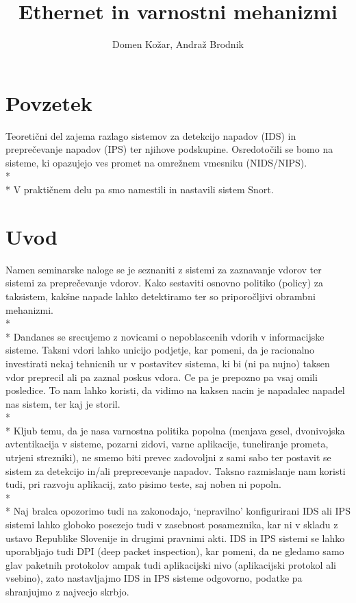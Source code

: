 \documentclass[12pt]{article}
\title{Ethernet in varnostni mehanizmi}
\author{Domen Kožar, Andraž Brodnik}
\let\stdsection\section
\renewcommand\section{\newpage\stdsection}
\begin{document}
\maketitle

\tableofcontents

\section{Povzetek}
Teoretični del zajema razlago sistemov za detekcijo napadov (IDS) in preprečevanje napadov (IPS) 
ter njihove podskupine. 
Osredotočili se bomo na sisteme, ki opazujejo ves promet na omrežnem vmesniku (NIDS/NIPS).
\\*
\\*
V praktičnem delu pa smo namestili in nastavili sistem Snort.

\section{Uvod}

Namen seminarske naloge se je seznaniti z sistemi za zaznavanje vdorov ter sistemi za preprečevanje vdorov. 
Kako sestaviti osnovno politiko (policy) za taksistem, kakšne napade lahko detektiramo ter so priporočljivi obrambni mehanizmi.
\\*
\\*
Dandanes se srecujemo z novicami o nepoblascenih vdorih v informacijske sisteme. Taksni vdori lahko unicijo podjetje, kar pomeni, da je racionalno investirati nekaj tehnicnih ur v postavitev sistema, ki bi (ni pa nujno) taksen vdor preprecil ali pa zaznal poskus vdora.
Ce pa je prepozno pa vsaj omili posledice. To nam lahko koristi,
da vidimo na kaksen nacin je napadalec napadel nas sistem, ter kaj je storil. 
\\*
\\*
Kljub temu, da je nasa varnostna politika popolna (menjava gesel, dvonivojska avtentikacija v sisteme, pozarni zidovi, varne aplikacije, tuneliranje prometa, utrjeni strezniki), ne smemo biti prevec zadovoljni z sami sabo ter postavit se sistem za detekcijo in/ali preprecevanje napadov.
Taksno razmislanje nam koristi tudi, pri razvoju aplikacij, zato pisimo teste, saj noben ni popoln.
\\*
\\*
Naj bralca opozorimo tudi na zakonodajo, `nepravilno' konfigurirani IDS ali IPS sistemi lahko globoko posezejo
tudi v zasebnost posameznika, kar ni v skladu z ustavo Republike Slovenije in drugimi pravnimi akti.
IDS in IPS sistemi se lahko uporabljajo tudi DPI (deep packet inspection), kar pomeni, da ne gledamo samo glav paketnih protokolov ampak tudi aplikacijski nivo (aplikacijski protokol ali vsebino), 
zato nastavljajmo IDS in IPS sisteme odgovorno, podatke pa shranjujmo z najvecjo skrbjo.
\end{document}
